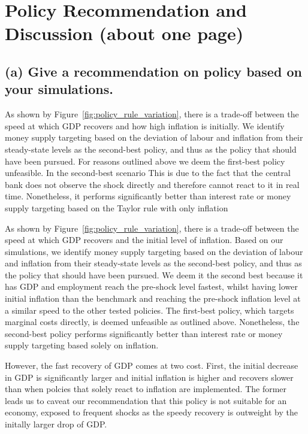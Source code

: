\documentclass[12pt]{article}
\begin{document}

\newpage
\section{Policy Recommendation and Discussion (about one page)}
\subsection*{(a) Give a recommendation on policy based on your simulations.}
As shown by Figure~\ref{fig:policy_rule_variation}, there is a trade-off between the speed at which GDP recovers and how high inflation is initially. We identify money supply targeting based on the deviation of labour and inflation from their steady-state levels as the second-best policy, and thus as the policy that should have been pursued. For reasons outlined above we deem the first-best policy unfeasible. In the second-best scenario This is due to the fact that the central bank does not observe the shock directly and therefore cannot react to it in real time. Nonetheless, it performs significantly better than interest rate or money supply targeting based on the Taylor rule with only inflation 

As shown by Figure~\ref{fig:policy_rule_variation}, there is a trade-off between the speed at which GDP recovers and the initial level of inflation. Based on our simulations, we identify money supply targeting based on the deviation of labour and inflation from their steady-state levels as the second-best policy, and thus as the policy that should have been pursued. We deem it the second best because it has GDP and employment reach the pre-shock level fastest, whilst having lower initial inflation than the benchmark and reaching the pre-shock inflation level at a similar speed to the other tested policies. The first-best policy, which targets marginal costs directly, is deemed unfeasible as outlined above. Nonetheless, the second-best policy performs significantly better than interest rate or money supply targeting based solely on inflation.

However, the fast recovery of GDP comes at two cost. First, the initial decrease in GDP is significantly larger and initial inflation is higher and recovers slower than when polcies that solely react to inflation are implemented. The former leads us to caveat our recommendation that this policy is not suitable for an economy, exposed to frequent shocks as the speedy recovery is outweight by the initally larger drop of GDP. 
\end{document}
